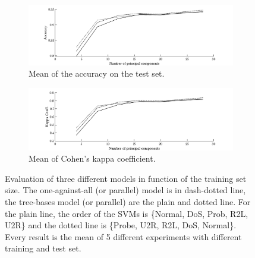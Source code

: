 \begin{figure}
        \begin{subfigure}[b]{1\textwidth}  
            \centering 
            \includegraphics[width=.98\textwidth]{parts/chap-4/img-svm/pca-acc.png}
            \caption{Mean of the accuracy on the test set.} 
        \end{subfigure}
        \vfill
        \begin{subfigure}[b]{1\textwidth}   
            \centering 
            \includegraphics[width=.98\textwidth]{parts/chap-4/img-svm/pca-kappa.png}
            \caption{Mean of Cohen's kappa coefficient.} 
        \end{subfigure}
        \caption{Evaluation of three different models in function of the training set size. The one-against-all (or parallel) model is in dash-dotted line, the tree-bases model (or parallel) are the plain and dotted line. For the plain line, the order of the SVMs is \{Normal, DoS, Prob, R2L, U2R\} and the dotted line is \{Probe, U2R, R2L, DoS, Normal\}. Every result is the mean of 5 different experiments with different training and test set.}
        \label{fig:svm-l}
\end{figure}


